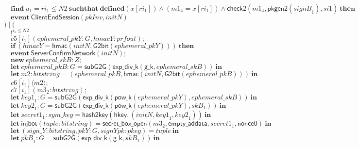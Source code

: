 \documentclass{article}
\newcommand{\cinput}[2]{{#1}({#2})}
\newcommand{\coutput}[2]{\overline{#1}\langle{#2}\rangle}
\newcommand{\kw}[1]{\mathbf{#1}}
\newcommand{\kwf}[1]{\mathsf{#1}}
\newcommand{\var}[1]{\mathit{#1}}
\newcommand{\kwt}[1]{\mathit{#1}}
\newcommand{\kwp}[1]{\mathit{#1}}
\newcommand{\kwc}[1]{\mathit{#1}}
\begin{document}
\begin{tabbing}
\>$\quad \kw{find}\ \var{u}_{1} = \var{ri}_{1} \leq \kwp{N2}\ \kw{suchthat}\ \kw{defined}(\var{x}[\var{ri}_{1}])\wedge (\var{m1}_{4}  =  \var{x}[\var{ri}_{1}]) \wedge  \kwf{check2}(\var{m1}_{4}, \kwf{pkgen2}(\var{signB}_{1}), \var{si1})\ \kw{then}$\\
\>$\quad \kw{event}\ \kwf{ClientEndSession}(\var{pkInv}, \var{initN})$\\
\>$) \mid ($\\
\>$\quad !^{\var{i}_{1} \leq \kwp{N2}}$\\
\>$\quad \cinput{\kwc{c5}[\var{i}_{1}]}{\var{ephemeral{\_}pkY}: \kwt{G}, \var{hmacY}: \kwt{prfout}};$\\
\>$\quad \kw{if}\ (\var{hmacY}  =  \kwf{hmac}(\var{initN}, \kwf{G2bit}(\var{ephemeral{\_}pkY})))\ \kw{then}$\\
\>$\quad \kw{event}\ \kwf{ServerConfirmNetwork}(\var{initN});$\\
\>$\quad \kw{new}\ \var{ephemeral{\_}skB}: \kwt{Z};$\\
\>$\quad \kw{let}\ \var{ephemeral{\_}pkB}: \kwt{G} = \kwf{subG2G}(\kwf{exp{\_}div{\_}k}(\kwf{g{\_}k}, \var{ephemeral{\_}skB}))\ \kw{in}$\\
\>$\quad \kw{let}\ \var{m2}: \kwt{bitstring} = \kwf{}(\var{ephemeral{\_}pkB}, \kwf{hmac}(\var{initN}, \kwf{G2bit}(\var{ephemeral{\_}pkB})))\ \kw{in}$\\
\>$\quad \coutput{\kwc{c6}[\var{i}_{1}]}{\var{m2}};$\\
\>$\quad \cinput{\kwc{c7}[\var{i}_{1}]}{\var{m3}_{2}: \kwt{bitstring}};$\\
\>$\quad \kw{let}\ \var{key1}_{1}: \kwt{G} = \kwf{subG2G}(\kwf{exp{\_}div{\_}k}(\kwf{pow{\_}k}(\var{ephemeral{\_}pkY}), \var{ephemeral{\_}skB}))\ \kw{in}$\\
\>$\quad \kw{let}\ \var{key2}_{1}: \kwt{G} = \kwf{subG2G}(\kwf{exp{\_}div{\_}k}(\kwf{pow{\_}k}(\var{ephemeral{\_}pkY}), \var{skB}_{1}))\ \kw{in}$\\
\>$\quad \kw{let}\ \var{secret1}_{1}: \kwt{sym{\_}key} = \kwf{hash2key}(\kwf{hkey}, \kwf{}(\var{initN}, \var{key1}_{1}, \var{key2}_{1}))\ \kw{in}$\\
\>$\quad \kw{let}\ \kwf{injbot}(\var{tuple}: \kwt{bitstring}) = \kwf{secret{\_}box{\_}open}(\var{m3}_{2}, \kwf{empty{\_}addata}, \var{secret1}_{1}, \kwf{nonce0})\ \kw{in}$\\
\>$\quad \kw{let}\ \kwf{}(\var{sign{\_}Y}: \kwt{bitstring}, \var{pkY}: \kwt{G}, \var{signYpk}: \kwt{pkey}) = \var{tuple}\ \kw{in}$\\
\>$\quad \kw{let}\ \var{pkB}_{1}: \kwt{G} = \kwf{subG2G}(\kwf{exp{\_}div{\_}k}(\kwf{g{\_}k}, \var{skB}_{1}))\ \kw{in}$\\

\end{tabbing}
\end{document}
